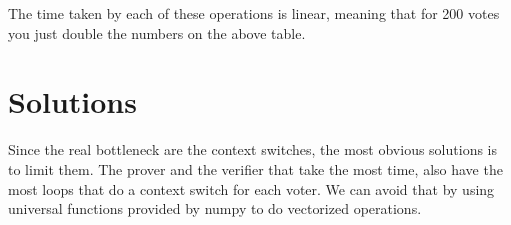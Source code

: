 \documentclass{article}
\begin{document}
The time taken by each of these operations is linear, meaning that for 200 votes
you just double the numbers on the above table.

\section{Solutions}

Since the real bottleneck are the context switches, the most obvious solutions is to
limit them. The prover and the verifier that take the most time, also have the most
loops that do a context switch for each voter. We can avoid that by using universal functions
provided by numpy\cite{numpy} to do vectorized operations.




\end{document}
